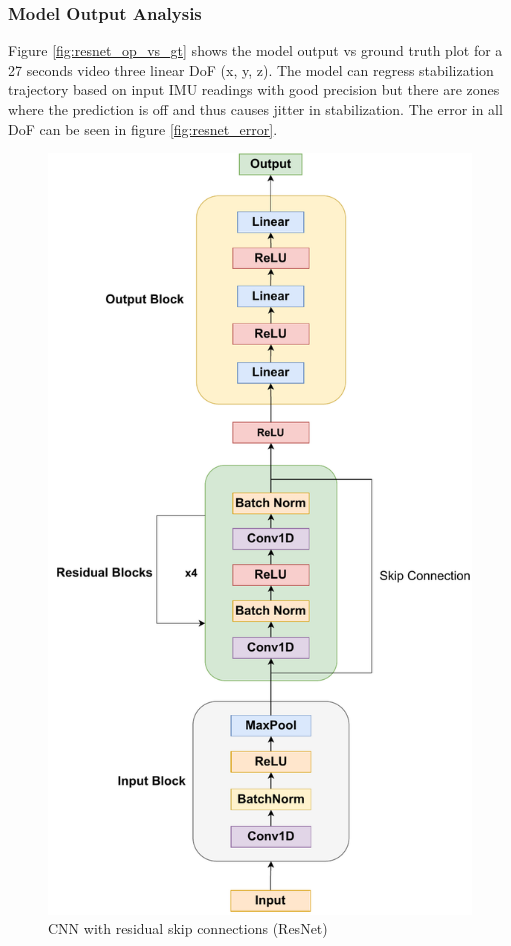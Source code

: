 \subsubsection{Model Output Analysis}
Figure \ref{fig:resnet_op_vs_gt} shows the model output vs ground truth plot for a 27 seconds video three linear DoF (x, y, z). The model can regress stabilization trajectory based on input IMU readings with good precision but there are zones where the prediction is off and thus causes jitter in stabilization. The error in all DoF can be seen in figure \ref{fig:resnet_error}.

\begin{figure}[H]
    \centering
    \includegraphics[scale=0.55]{images/fig_chapter2/nns/resnet_mt.pdf}
    \caption{CNN with residual skip connections (ResNet)}
    \label{fig:resnet_used}
\end{figure}

